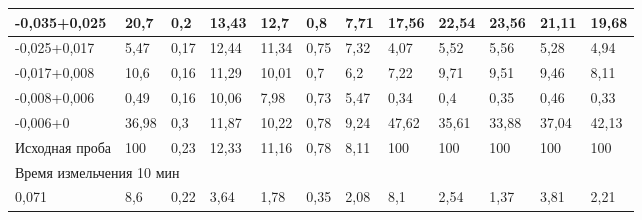 {\begin{longtable}[c]{|p{}lllllllllll|}
\multicolumn{1}{|l|}{-0,035+0,025} & \multicolumn{1}{l|}{20,7} & \multicolumn{1}{l|}{0,2} & \multicolumn{1}{l|}{13,43} & \multicolumn{1}{l|}{12,7} & \multicolumn{1}{l|}{0,8} & \multicolumn{1}{l|}{7,71} & \multicolumn{1}{l|}{17,56} & \multicolumn{1}{l|}{22,54} & \multicolumn{1}{l|}{23,56} & \multicolumn{1}{l|}{21,11} & 19,68 \\ \hline
\multicolumn{1}{|l|}{-0,025+0,017} & \multicolumn{1}{l|}{5,47} & \multicolumn{1}{l|}{0,17} & \multicolumn{1}{l|}{12,44} & \multicolumn{1}{l|}{11,34} & \multicolumn{1}{l|}{0,75} & \multicolumn{1}{l|}{7,32} & \multicolumn{1}{l|}{4,07} & \multicolumn{1}{l|}{5,52} & \multicolumn{1}{l|}{5,56} & \multicolumn{1}{l|}{5,28} & 4,94 \\ \hline
\multicolumn{1}{|l|}{-0,017+0,008} & \multicolumn{1}{l|}{10,6} & \multicolumn{1}{l|}{0,16} & \multicolumn{1}{l|}{11,29} & \multicolumn{1}{l|}{10,01} & \multicolumn{1}{l|}{0,7} & \multicolumn{1}{l|}{6,2} & \multicolumn{1}{l|}{7,22} & \multicolumn{1}{l|}{9,71} & \multicolumn{1}{l|}{9,51} & \multicolumn{1}{l|}{9,46} & 8,11 \\ \hline
\multicolumn{1}{|l|}{-0,008+0,006} & \multicolumn{1}{l|}{0,49} & \multicolumn{1}{l|}{0,16} & \multicolumn{1}{l|}{10,06} & \multicolumn{1}{l|}{7,98} & \multicolumn{1}{l|}{0,73} & \multicolumn{1}{l|}{5,47} & \multicolumn{1}{l|}{0,34} & \multicolumn{1}{l|}{0,4} & \multicolumn{1}{l|}{0,35} & \multicolumn{1}{l|}{0,46} & 0,33 \\ \hline
\multicolumn{1}{|l|}{-0,006+0} & \multicolumn{1}{l|}{36,98} & \multicolumn{1}{l|}{0,3} & \multicolumn{1}{l|}{11,87} & \multicolumn{1}{l|}{10,22} & \multicolumn{1}{l|}{0,78} & \multicolumn{1}{l|}{9,24} & \multicolumn{1}{l|}{47,62} & \multicolumn{1}{l|}{35,61} & \multicolumn{1}{l|}{33,88} & \multicolumn{1}{l|}{37,04} & 42,13 \\ \hline
\multicolumn{1}{|l|}{Исходная проба} & \multicolumn{1}{l|}{100} & \multicolumn{1}{l|}{0,23} & \multicolumn{1}{l|}{12,33} & \multicolumn{1}{l|}{11,16} & \multicolumn{1}{l|}{0,78} & \multicolumn{1}{l|}{8,11} & \multicolumn{1}{l|}{100} & \multicolumn{1}{l|}{100} & \multicolumn{1}{l|}{100} & \multicolumn{1}{l|}{100} & 100 \\ \hline
\multicolumn{12}{|l|}{Время измельчения 10 мин} \\ \hline
\multicolumn{1}{|l|}{0,071} & \multicolumn{1}{l|}{8,6} & \multicolumn{1}{l|}{0,22} & \multicolumn{1}{l|}{3,64} & \multicolumn{1}{l|}{1,78} & \multicolumn{1}{l|}{0,35} & \multicolumn{1}{l|}{2,08} & \multicolumn{1}{l|}{8,1} & \multicolumn{1}{l|}{2,54} & \multicolumn{1}{l|}{1,37} & \multicolumn{1}{l|}{3,81} & 2,21 \\ \hline

\end{longtable}}
